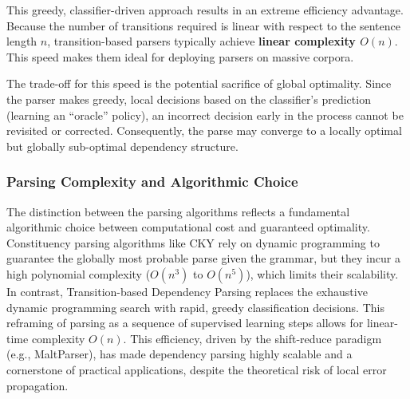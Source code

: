 \documentclass{article}
\begin{document}
This greedy, classifier-driven approach results in an extreme efficiency advantage. Because the number of transitions required is linear with respect to the sentence length $n$, transition-based parsers typically achieve \textbf{linear complexity $O(n)$}. This speed makes them ideal for deploying parsers on massive corpora.

The trade-off for this speed is the potential sacrifice of global optimality. Since the parser makes greedy, local decisions based on the classifier's prediction (learning an ``oracle'' policy), an incorrect decision early in the process cannot be revisited or corrected. Consequently, the parse may converge to a locally optimal but globally sub-optimal dependency structure.

\subsubsection{Parsing Complexity and Algorithmic Choice}

The distinction between the parsing algorithms reflects a fundamental algorithmic choice between computational cost and guaranteed optimality. Constituency parsing algorithms like CKY rely on dynamic programming to guarantee the globally most probable parse given the grammar, but they incur a high polynomial complexity ($O(n^3)$ to $O(n^5)$), which limits their scalability. In contrast, Transition-based Dependency Parsing replaces the exhaustive dynamic programming search with rapid, greedy classification decisions. This reframing of parsing as a sequence of supervised learning steps allows for linear-time complexity $O(n)$. This efficiency, driven by the shift-reduce paradigm (e.g., MaltParser), has made dependency parsing highly scalable and a cornerstone of practical applications, despite the theoretical risk of local error propagation.
\end{document}
